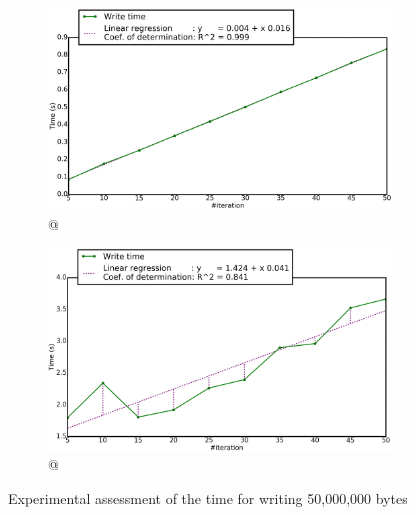 			\begin{figure}[!h]
				\centering
				\begin{subfigure}[b]{0.475\textwidth}
					\centering
					\includegraphics[width=\textwidth]{charts/writeTimeExample_workstation_8core.png}
					\caption[\targetPlatformLaptop \space @ \targetPlatformLaptopFrequency]
					{{\small \targetPlatformLaptop \space @ \targetPlatformLaptopFrequency}}
					\label{fig:writeTimeExample_workstation}
				\end{subfigure}
				\hfill
				\begin{subfigure}[b]{0.475\textwidth}  
					\centering 
					\includegraphics[width=\textwidth]{charts/writeTimeExample_HPC_jureca.png}
					\caption[]%
					{{\small \targetPlatformHpc \space @ \targetPlatformHpcFrequency}}    
					\label{fig:writeTimeExample_hpc}
				\end{subfigure}
				\caption{Experimental assessment of the time for writing 50,000,000 bytes}
				\label{fig:writeTimeExample}
			\end{figure}

